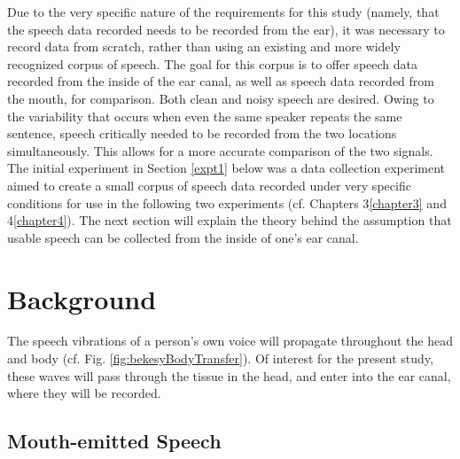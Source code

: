 \documentclass[dissertation,copyright]{uathesis}
\begin{document}
Due to the very specific nature of the requirements for this study (namely, that the speech data recorded needs to be recorded from the ear), it was necessary to record data from scratch, rather than using an existing and more widely recognized corpus of speech.  The goal for this corpus is to offer speech data recorded from the inside of the ear canal, as well as speech data recorded from the mouth, for comparison.  Both clean and noisy speech are desired.
Owing to the variability that occurs when even the same speaker repeats the same sentence, speech critically needed to be recorded from the two locations simultaneously.  This allows for a more accurate comparison of the two signals.
The initial experiment in Section \ref{expt1} below was a data collection experiment aimed to create a small corpus of speech data recorded under very specific conditions for use in the following two experiments (cf. Chapters 3\ref{chapter3} and 4\ref{chapter4}).  The next section will explain the theory behind the assumption that usable speech can be collected from the inside of one's ear canal.

\section{Background}

The speech vibrations of a person's own voice will propagate throughout the head and body (cf. Fig. \ref{fig:bekesyBodyTransfer}).  Of interest for the present study, these waves will pass through the tissue in the head, and enter into the ear canal, where they will be recorded.

\subsection{Mouth-emitted Speech}
\end{document}
